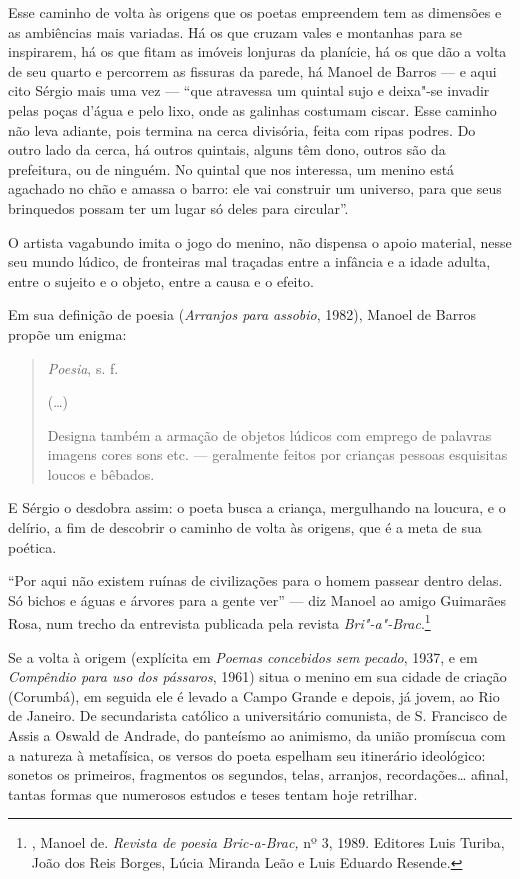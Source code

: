 Esse caminho de volta às origens que os poetas empreendem tem as
dimensões e as ambiências mais variadas. Há os que cruzam vales e
montanhas para se inspirarem, há os que fitam as imóveis
lonjuras da planície, há os que dão a volta de seu quarto e percorrem as
fissuras da parede, há Manoel de Barros --- e aqui cito Sérgio mais uma
vez --- ``que atravessa um quintal sujo e deixa"-se invadir pelas poças
d'água e pelo lixo, onde as galinhas costumam ciscar. Esse caminho não
leva adiante, pois termina na cerca divisória, feita com ripas podres.
Do outro lado da cerca, há outros quintais, alguns têm dono, outros são
da prefeitura, ou de ninguém. No quintal que nos interessa, um menino
está agachado no chão e amassa o barro: ele vai construir um universo,
para que seus brinquedos possam ter um lugar só deles para circular''.

O artista vagabundo imita o jogo do menino, não dispensa o apoio
material, nesse seu mundo lúdico, de fronteiras mal traçadas entre a
infância e a idade adulta, entre o sujeito e o objeto, entre a causa e o
efeito.

Em sua definição de poesia (\emph{Arranjos para assobio}, 1982), Manoel
de Barros propõe um enigma:


\begin{quotation}
\emph{Poesia}, s. f.

(\ldots{})

Designa também a armação de objetos lúdicos com emprego de palavras
imagens cores sons etc. --- geralmente feitos por crianças
pessoas esquisitas loucos e bêbados.
\end{quotation}

E Sérgio o desdobra assim: o poeta busca a criança, mergulhando na
loucura, e o delírio, a fim de descobrir o caminho de volta às origens,
que é a meta de sua poética.

``Por aqui não existem ruínas de civilizações para o homem passear
dentro delas. Só bichos e águas e árvores para a gente ver'' --- diz
Manoel ao amigo Guimarães Rosa, num trecho da entrevista publicada pela
revista \emph{Bri"-a"-Brac}.\footnote{, Manoel de. \emph{Revista de
  poesia Bric-a-Brac,} nº 3, 1989. Editores Luis Turiba, João dos Reis
  Borges, Lúcia Miranda Leão e Luis Eduardo Resende.}

Se a volta à origem (explícita em \emph{Poemas concebidos sem pecado}, 1937, e em \emph{Compêndio para uso dos pássaros}, 1961) situa o menino
em sua cidade de criação (Corumbá), em seguida ele é levado a Campo
Grande e depois, já jovem, ao Rio de Janeiro. De secundarista católico a
universitário comunista, de S. Francisco de Assis a Oswald de Andrade,
do panteísmo ao animismo, da união promíscua com a natureza à
metafísica, os versos do poeta espelham seu itinerário ideológico:
sonetos os primeiros, fragmentos os segundos, telas, arranjos,
recordações\ldots{} afinal, tantas formas que numerosos estudos e teses
tentam hoje retrilhar.

